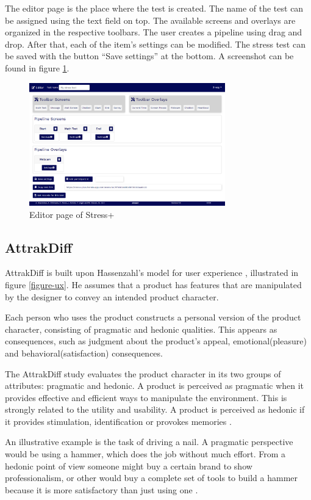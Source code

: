 \documentclass[conference]{IEEEtran}
\begin{document}
The editor page is the place where the test is created. The name of the test can
be assigned using the text field on top. The available screens and overlays are
organized in the respective toolbars. The user creates a pipeline using drag and
drop. After that, each of the item's settings can be modified. The stress test
can be saved with the button ``Save settings'' at the bottom. A screenshot can be
found in figure \ref{editor-fig}.

\begin{figure}[t!]
\centering
\includegraphics[width=8.5cm]{AttrakDiff/screenshot-editor-with-items.png}
\caption{\label{editor-fig}Editor page of Stress+}
\end{figure}

\subsection{AttrakDiff}
\label{sec:AttrakDiff}
AttrakDiff is built upon Hassenzahl’s model for user experience
\cite{inbook_userProduct}, illustrated in figure \ref{figure-ux}. He assumes that a
product has features that are manipulated by the designer to convey an intended
product character.

Each person who uses the product constructs a personal version of the product
character, consisting of pragmatic and hedonic qualities. This appears as
consequences, such as judgment about the product's appeal, emotional(pleasure)
and behavioral(satisfaction) consequences.

The AttrakDiff study evaluates the product character in its two groups of
attributes: pragmatic and hedonic. A product is perceived as pragmatic when it
provides effective and efficient ways to manipulate the environment. This is
strongly related to the utility and usability. A product is perceived as hedonic
if it provides stimulation, identification or provokes memories \cite{article}.

An illustrative example is the task of driving a nail. A pragmatic perspective
would be using a hammer, which does the job without much effort. From a hedonic
point of view someone might buy a certain brand to show professionalism, or
other would buy a complete set of tools to build a hammer because it is more satisfactory than just using one
\cite{inbook_userProduct}.
\end{document}
